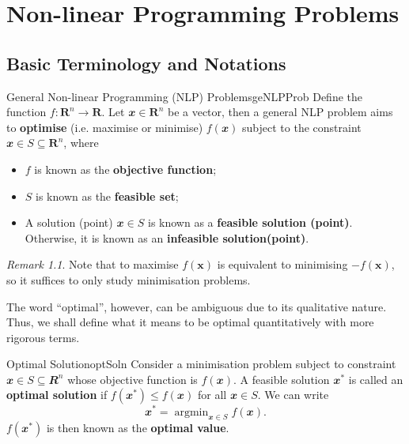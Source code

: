 \documentclass[math, code]{amznotes}
\theoremstyle{remark}
\newtheorem*{remark}{Remark}
\DeclareMathOperator*{\argmin}{argmin}
\begin{document}
\tableofcontents

\chapter{Non-linear Programming Problems}
\section{Basic Terminology and Notations}
\begin{dfnbox}{General Non-linear Programming (NLP) Problems}{geNLPProb}
    Define the function $f \colon \mathbf{R}^n \to \mathbf{R}$. Let $\mathbfit{x} \in \mathbf{R}^n$ be a vector, then a general NLP problem aims to {\color{red} \textbf{optimise}} (i.e. maximise or minimise) $f(\mathbfit{x})$ subject to the constraint $\mathbfit{x} \in S \subseteq \mathbf{R}^n$, where
    \begin{itemize}
        \item $f$ is known as the {\color{red} \textbf{objective function}};
        \item $S$ is known as the {\color{red} \textbf{feasible set}};
        \item A solution (point) $\mathbfit{x} \in S$ is known as a {\color{red} \textbf{feasible solution (point)}}. Otherwise, it is known as an {\color{red} \textbf{infeasible solution(point)}}. 
    \end{itemize}
\end{dfnbox}
\begin{notebox}
    \begin{remark}
        Note that to maximise $f(\mathbf{x})$ is equivalent to minimising $-f(\mathbf{x})$, so it suffices to only study minimisation problems.
    \end{remark}
\end{notebox}
The word ``optimal'', however, can be ambiguous due to its qualitative nature. Thus, we shall define what it means to be optimal quantitatively with more rigorous terms.
\begin{dfnbox}{Optimal Solution}{optSoln}
    Consider a minimisation problem subject to constraint $\mathbfit{x} \in S \subseteq \mathbfit{R}^n$ whose objective function is $f(\mathbfit{x})$. A feasible solution $\mathbfit{x}^*$ is called an {\color{red} \textbf{optimal solution}} if $f(\mathbfit{x}^*) \leq f(\mathbfit{x})$ for all $\mathbfit{x} \in S$. We can write
    \begin{equation*}
        \mathbfit{x}^* = \argmin_{\mathbfit{x} \in S} f(\mathbfit{x}).
    \end{equation*}
    $f(\mathbfit{x}^*)$ is then known as the {\color{red} \textbf{optimal value}}.
\end{dfnbox}
\end{document}
